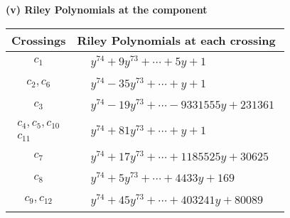\documentclass[1p]{elsarticle_modified}
\theoremstyle{definition}
\begin{document}
\newpage\renewcommand{\arraystretch}{1}
\flushleft \textbf{(v) Riley Polynomials at the component}\newline \\
\begin{tabular}{m{50pt}|m{274pt}}
Crossings & \hspace{64pt}Riley Polynomials at each crossing \\
\hline $$\begin{aligned}c_{1}\end{aligned}$$&$\begin{aligned}
&y^{74}+9 y^{73}+\cdots+5 y+1
\end{aligned}$\\
\hline $$\begin{aligned}c_{2},c_{6}\end{aligned}$$&$\begin{aligned}
&y^{74}-35 y^{73}+\cdots+y+1
\end{aligned}$\\
\hline $$\begin{aligned}c_{3}\end{aligned}$$&$\begin{aligned}
&y^{74}-19 y^{73}+\cdots-9331555 y+231361
\end{aligned}$\\
\hline $$\begin{aligned}c_{4},c_{5},c_{10}\\c_{11}\end{aligned}$$&$\begin{aligned}
&y^{74}+81 y^{73}+\cdots+y+1
\end{aligned}$\\
\hline $$\begin{aligned}c_{7}\end{aligned}$$&$\begin{aligned}
&y^{74}+17 y^{73}+\cdots+1185525 y+30625
\end{aligned}$\\
\hline $$\begin{aligned}c_{8}\end{aligned}$$&$\begin{aligned}
&y^{74}+5 y^{73}+\cdots+4433 y+169
\end{aligned}$\\
\hline $$\begin{aligned}c_{9},c_{12}\end{aligned}$$&$\begin{aligned}
&y^{74}+45 y^{73}+\cdots+403241 y+80089
\end{aligned}$\\
\hline
\end{tabular}\\~\\
\end{document}
